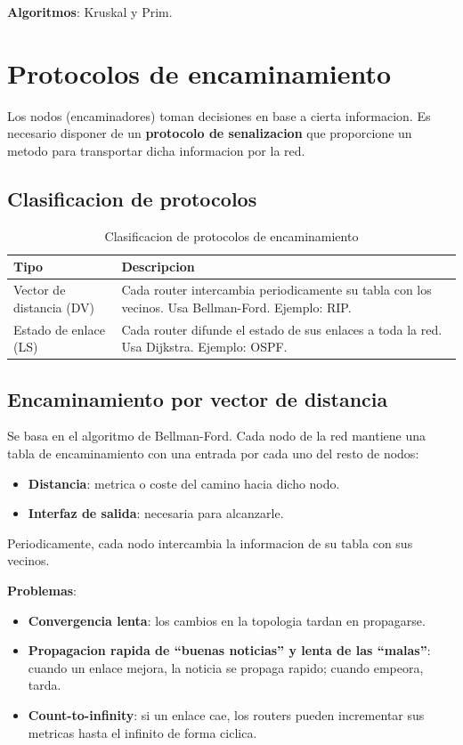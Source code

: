 \textbf{Algoritmos}: Kruskal y Prim.


\section{Protocolos de encaminamiento}

Los nodos (encaminadores) toman decisiones en base a cierta informacion. Es
necesario disponer de un \textbf{protocolo de senalizacion} que proporcione un metodo
para transportar dicha informacion por la red.

\subsection{Clasificacion de protocolos}

\begin{table}[htbp]
\centering
\small
\caption{Clasificacion de protocolos de encaminamiento}
\begin{tabularx}{\textwidth}{@{}l>{\raggedright\arraybackslash}X@{}}
\toprule
\textbf{Tipo} & \textbf{Descripcion} \\
\midrule
Vector de distancia (DV) & Cada router intercambia periodicamente su tabla con los vecinos. Usa Bellman-Ford. Ejemplo: RIP. \\
Estado de enlace (LS) & Cada router difunde el estado de sus enlaces a toda la red. Usa Dijkstra. Ejemplo: OSPF. \\
\bottomrule
\end{tabularx}
\end{table}

\subsection{Encaminamiento por vector de distancia}

Se basa en el algoritmo de Bellman-Ford. Cada nodo de la red mantiene una tabla
de encaminamiento con una entrada por cada uno del resto de nodos:

\begin{itemize}
    \item \textbf{Distancia}: metrica o coste del camino hacia dicho nodo.
    \item \textbf{Interfaz de salida}: necesaria para alcanzarle.
\end{itemize}

Periodicamente, cada nodo intercambia la informacion de su tabla con sus vecinos.

\textbf{Problemas}:
\begin{itemize}
    \item \textbf{Convergencia lenta}: los cambios en la topologia tardan en propagarse.
    \item \textbf{Propagacion rapida de ``buenas noticias'' y lenta de las ``malas''}:
    cuando un enlace mejora, la noticia se propaga rapido; cuando empeora, tarda.
    \item \textbf{Count-to-infinity}: si un enlace cae, los routers pueden incrementar
    sus metricas hasta el infinito de forma ciclica.
\end{itemize}

